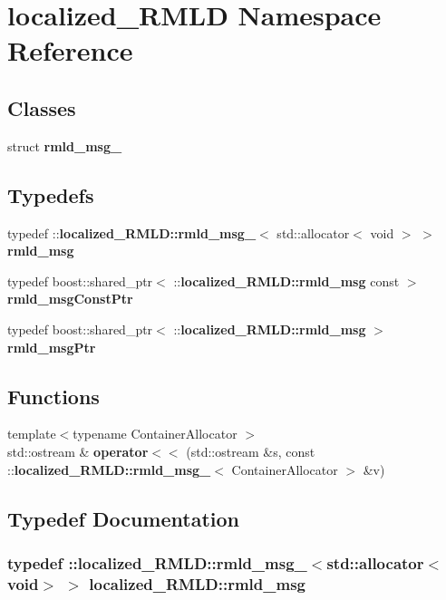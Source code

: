 \section{localized\_\-RMLD Namespace Reference}
\label{namespacelocalized__RMLD}
\subsection*{Classes}
\begin{DoxyCompactItemize}
\item 
struct {\bf rmld\_\-msg\_\-}
\end{DoxyCompactItemize}
\subsection*{Typedefs}
\begin{DoxyCompactItemize}
\item 
typedef ::{\bf localized\_\-RMLD::rmld\_\-msg\_\-}$<$ std::allocator$<$ void $>$ $>$ {\bf rmld\_\-msg}
\item 
typedef boost::shared\_\-ptr$<$ ::{\bf localized\_\-RMLD::rmld\_\-msg} const  $>$ {\bf rmld\_\-msgConstPtr}
\item 
typedef boost::shared\_\-ptr$<$ ::{\bf localized\_\-RMLD::rmld\_\-msg} $>$ {\bf rmld\_\-msgPtr}
\end{DoxyCompactItemize}
\subsection*{Functions}
\begin{DoxyCompactItemize}
\item 
{\footnotesize template$<$typename ContainerAllocator $>$ }\\std::ostream \& {\bf operator$<$$<$} (std::ostream \&s, const ::{\bf localized\_\-RMLD::rmld\_\-msg\_\-}$<$ ContainerAllocator $>$ \&v)
\end{DoxyCompactItemize}


\subsection{Typedef Documentation}
\subsubsection[{rmld\_\-msg}]{\setlength{\rightskip}{0pt plus 5cm}typedef ::{\bf localized\_\-RMLD::rmld\_\-msg\_\-}$<$std::allocator$<$void$>$ $>$ {\bf localized\_\-RMLD::rmld\_\-msg}}\label{namespacelocalized__RMLD_a169aca565450631a39f778c1287a3832}


